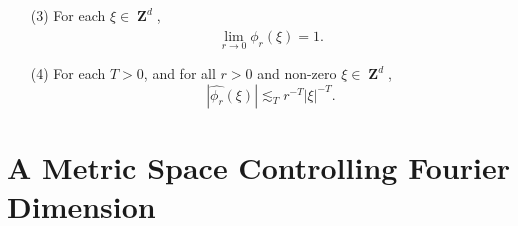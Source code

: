 \documentclass[12pt,reqno]{article}
\numberwithin{equation}{section}
\DeclareMathOperator{\ZZ}{\mathbf{Z}}
\DeclareMathOperator{\TT}{\mathbf{T}}
\begin{document}
\begin{itemize}
\begin{enumerate}

    \item[(3)] For each $\xi \in \ZZ^d$,
    \begin{equation} \label{approximationtoidentitypointwiseconvergence}
        \lim_{r \to 0} \widehat{\phi_r}(\xi) = 1.
    \end{equation}

    \item[(4)] For each $T > 0$, and for all $r > 0$ and non-zero $\xi \in \ZZ^d$,
    \begin{equation} \label{molificationdecaybound}
        |\widehat{\phi_r}(\xi)| \lesssim_T r^{-T} |\xi|^{-T}.
    \end{equation}
\end{enumerate}
\end{itemize}

\section{A Metric Space Controlling Fourier Dimension}
\end{document}
